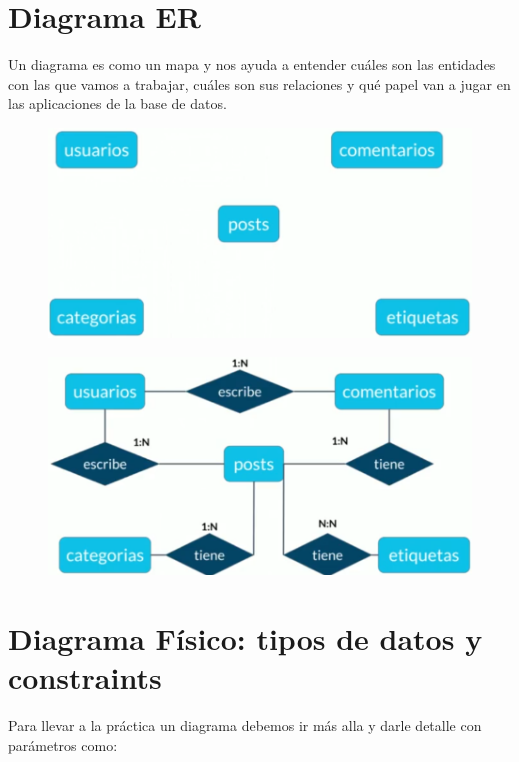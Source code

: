 \documentclass{article}
\begin{document}
\newpage

\section{Diagrama ER}%
Un diagrama es como un mapa y nos ayuda a entender cuáles son las entidades con
las que vamos a trabajar, cuáles son sus relaciones y qué papel van a jugar en
las aplicaciones de la base de datos.

\begin{figure}[h!]
    \centering
      \includegraphics[scale=0.5]{./Pictures/018_DiagramaER.png}
\end{figure}

\begin{figure}[h!]
    \centering
      \includegraphics[scale=0.5]{./Pictures/019_diagrama_ER.png}
\end{figure}

\section{Diagrama Físico: tipos de datos y constraints}%
Para llevar a la práctica un diagrama debemos ir más alla y darle detalle con
parámetros como:
\end{document}
